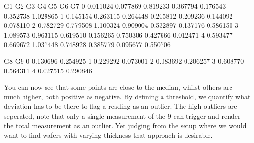 \documentclass[letterpaper,10pt,english]{jupyterBook}
\begin{document}
\begin{sphinxVerbatim}[commandchars=\\\{\}]
         G1        G2        G3        G4        G5        G6        G7  \PYGZbs{}
0 \PYGZhy{}0.011024 \PYGZhy{}0.077869 \PYGZhy{}0.819233 \PYGZhy{}0.367794  0.176543 \PYGZhy{}0.352738 \PYGZhy{}1.029865   
1 \PYGZhy{}0.145154 \PYGZhy{}0.263115 \PYGZhy{}0.264448 \PYGZhy{}0.205812 \PYGZhy{}0.209236 \PYGZhy{}0.144092 \PYGZhy{}0.078110   
2  0.782729  0.779508  1.100324  0.909004  0.532897  0.137176  0.586150   
3  1.089573  0.963115  0.619510  0.156265  0.750306  0.427666 \PYGZhy{}0.012471   
4  0.593477  0.669672  1.037448  0.748928  0.385779  0.095677  0.550706   

         G8        G9  
0 \PYGZhy{}0.130696 \PYGZhy{}0.254925  
1 \PYGZhy{}0.229292  0.073001  
2  0.083692  0.206257  
3 \PYGZhy{}0.608770  0.564311  
4  0.027515  0.290846  
\end{sphinxVerbatim}

\sphinxAtStartPar
You can now see that some points are close to the median, whilst others are much higher, both positive as negative.
By defining a threshold, we quantify what deviation has to be there to flag a reading as an outlier.
The high outliers are seperated, note that only a single measurement of the 9 can trigger and render the total measurement as an outlier.
Yet judging from the setup where we would want to find wafers with varying thickness that approach is desirable.

\begin{sphinxVerbatim}[commandchars=\\\{\}]
\PYG{p}{[}\PYG{p}{]}
\end{sphinxVerbatim}
\end{document}

